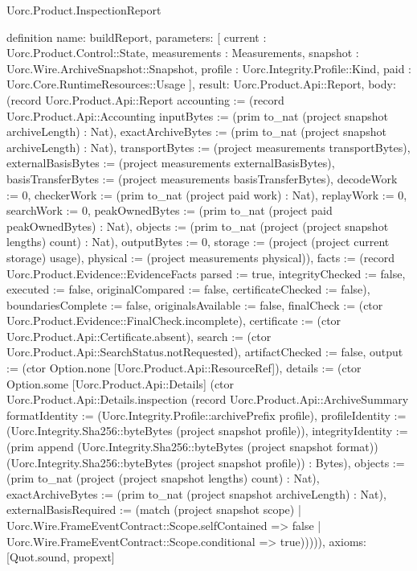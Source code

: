 \begin{lexlean}{Uorc.Product.InspectionReport}
\begin{semanticmodule}
definition{
  name: buildReport,
  parameters: [
    current : Uorc.Product.Control::State,
    measurements : Measurements,
    snapshot : Uorc.Wire.ArchiveSnapshot::Snapshot,
    profile : Uorc.Integrity.Profile::Kind,
    paid : Uorc.Core.RuntimeResources::Usage
  ],
  result: Uorc.Product.Api::Report,
  body: (record Uorc.Product.Api::Report {accounting := (record Uorc.Product.Api::Accounting {inputBytes := (prim to_nat (project snapshot archiveLength) : Nat), exactArchiveBytes := (prim to_nat (project snapshot archiveLength) : Nat), transportBytes := (project measurements transportBytes), externalBasisBytes := (project measurements externalBasisBytes), basisTransferBytes := (project measurements basisTransferBytes), decodeWork := 0, checkerWork := (prim to_nat (project paid work) : Nat), replayWork := 0, searchWork := 0, peakOwnedBytes := (prim to_nat (project paid peakOwnedBytes) : Nat), objects := (prim to_nat (project (project snapshot lengths) count) : Nat), outputBytes := 0, storage := (project (project current storage) usage), physical := (project measurements physical)}), facts := (record Uorc.Product.Evidence::EvidenceFacts {parsed := true, integrityChecked := false, executed := false, originalCompared := false, certificateChecked := false}), boundariesComplete := false, originalsAvailable := false, finalCheck := (ctor Uorc.Product.Evidence::FinalCheck.incomplete), certificate := (ctor Uorc.Product.Api::Certificate.absent), search := (ctor Uorc.Product.Api::SearchStatus.notRequested), artifactChecked := false, output := (ctor Option.none [Uorc.Product.Api::ResourceRef]), details := (ctor Option.some [Uorc.Product.Api::Details] (ctor Uorc.Product.Api::Details.inspection (record Uorc.Product.Api::ArchiveSummary {formatIdentity := (Uorc.Integrity.Profile::archivePrefix profile), profileIdentity := (Uorc.Integrity.Sha256::byteBytes (project snapshot profile)), integrityIdentity := (prim append (Uorc.Integrity.Sha256::byteBytes (project snapshot format)) (Uorc.Integrity.Sha256::byteBytes (project snapshot profile)) : Bytes), objects := (prim to_nat (project (project snapshot lengths) count) : Nat), exactArchiveBytes := (prim to_nat (project snapshot archiveLength) : Nat), externalBasisRequired := (match (project snapshot scope)
    | Uorc.Wire.FrameEventContract::Scope.selfContained => false
    | Uorc.Wire.FrameEventContract::Scope.conditional => true)})))}),
  axioms: [Quot.sound, propext]
}


\end{semanticmodule}
\end{lexlean}
